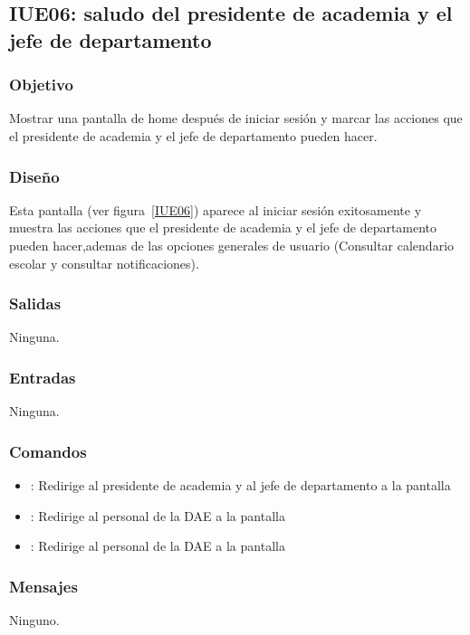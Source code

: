 \subsection{IUE06: saludo del presidente de academia y el jefe de departamento}

\subsubsection{Objetivo}
Mostrar una pantalla de home después de iniciar sesión y marcar las acciones que el presidente de academia y el jefe de departamento pueden hacer.

\subsubsection{Diseño}
Esta pantalla  (ver figura~\ref{IUE06}) aparece al iniciar sesión exitosamente y muestra las acciones que el presidente de academia y el jefe de departamento pueden hacer,ademas de las opciones generales de usuario (Consultar calendario escolar y consultar notificaciones). 


\subsubsection{Salidas}
 
Ninguna.

\subsubsection{Entradas}
Ninguna.

\subsubsection{Comandos}
\begin{itemize}
	\item {}: Redirige al presidente de academia y al jefe de departamento a la pantalla 
	\item {}: Redirige al personal de la DAE a la pantalla 
	\item {}: Redirige al personal de la DAE a la pantalla 
	
\end{itemize}

\subsubsection{Mensajes}

\begin{Citemize}
	\item Ninguno.
\end{Citemize}